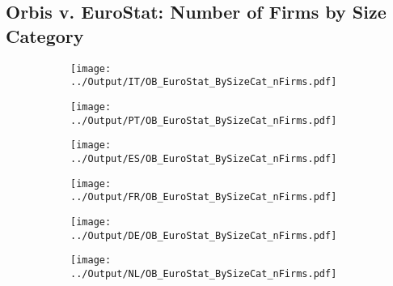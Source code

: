 \documentclass[12pt,notitlepage]{article}
\begin{document}
\subsection{Orbis v. EuroStat: Number of Firms by Size Category}
\begin{figure}[!htpb]
\centering
\begin{subfigure}{.49\textwidth}
    \centering
 \texttt{[image: ../Output/IT/OB\_EuroStat\_BySizeCat\_nFirms.pdf]}
\end{subfigure}%
\begin{subfigure}{.49\textwidth}
    \centering
 \texttt{[image: ../Output/PT/OB\_EuroStat\_BySizeCat\_nFirms.pdf]}
\end{subfigure}
\begin{subfigure}{.49\textwidth}
    \centering
 \texttt{[image: ../Output/ES/OB\_EuroStat\_BySizeCat\_nFirms.pdf]}
\end{subfigure}%
\begin{subfigure}{.49\textwidth}
    \centering
 \texttt{[image: ../Output/FR/OB\_EuroStat\_BySizeCat\_nFirms.pdf]}
\end{subfigure}
\begin{subfigure}{.49\textwidth}
    \centering
 \texttt{[image: ../Output/DE/OB\_EuroStat\_BySizeCat\_nFirms.pdf]}
\end{subfigure}
\begin{subfigure}{.49\textwidth}
    \centering
 \texttt{[image: ../Output/NL/OB\_EuroStat\_BySizeCat\_nFirms.pdf]}
\end{subfigure}
\end{figure}
\clearpage
\end{document}
